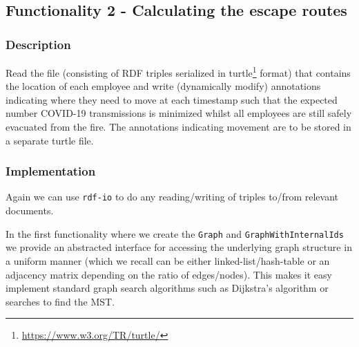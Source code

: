 \documentclass{article}
\begin{document}
        
\subsection{Functionality 2 - Calculating the escape routes}
\subsubsection{Description}
    Read the file (consisting of RDF triples serialized in turtle\footnote{\url{https://www.w3.org/TR/turtle/}} format) that contains the location of each employee and write (dynamically modify) annotations indicating where they need to move at each timestamp such that the expected number COVID-19 transmissions is minimized whilst all employees are still safely evacuated from the fire. The annotations indicating movement are to be stored in a separate turtle file. %
\subsubsection{Implementation}
    Again we can use \texttt{rdf-io} to do any reading/writing of triples to/from relevant documents. 
    
    In the first functionality where we create the \texttt{Graph} and \texttt{GraphWithInternalIds} we provide an abstracted interface for accessing the underlying graph structure in a uniform manner (which we recall can be either linked-list/hash-table or an adjacency matrix depending on the ratio of edges/nodes). This makes it easy implement standard graph search algorithms such as Dijkstra's algorithm or searches to find the MST.
    
\end{document}
